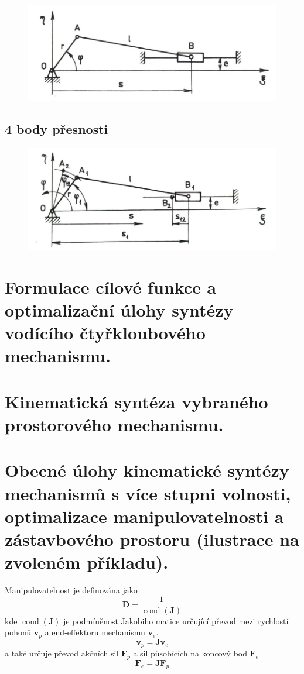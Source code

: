 \documentclass{article}
\begin{document}
	\begin{figure}[h!]
		\centering
		\includegraphics{figs/KlikovyMechanismus.png}
	\end{figure}

	\subsection*{4 body přesnosti}
	\begin{figure}[h!]
		\centering
		\includegraphics{figs/KlikovyMechanismus4.png}
	\end{figure}

	\section{Formulace cílové funkce a optimalizační úlohy syntézy vodícího čtyřkloubového mechanismu.}

	\section{Kinematická syntéza vybraného prostorového mechanismu.}

	\section{Obecné úlohy kinematické syntézy mechanismů s více stupni volnosti, optimalizace manipulovatelnosti a zástavbového prostoru (ilustrace na zvoleném příkladu).}

	Manipulovatelnost je definována jako
	\begin{equation}
		\bm{D} = \frac{1}{\operatorname{cond}(\bm{J})}
	\end{equation}
	kde $\operatorname{cond}(\bm{J})$ je podmíněnost Jakobiho matice určující převod mezi rychlostí pohonů $\bm{v}_p$ a end-effektoru mechanismu $\bm{v}_e$.
	\begin{equation}
		\bm{v}_p = \bm{J} \bm{v}_e
	\end{equation}
	a také určuje převod akčních sil $\bm{F}_p$ a sil působících na koncový bod $\bm{F}_e$
	\begin{equation}
		\bm{F}_e = \bm{J} \bm{F}_p
	\end{equation}
\end{document}
